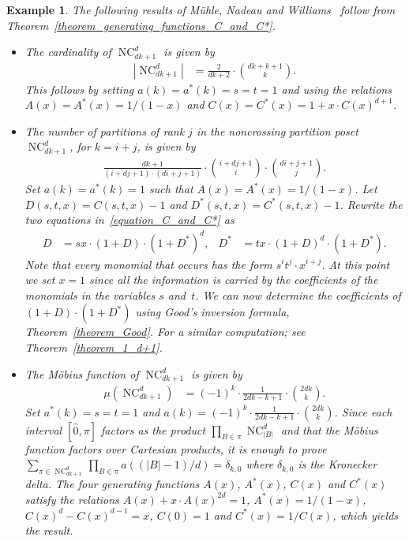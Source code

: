 \documentclass[11pt]{amsart}
\newtheorem{example}[theorem]{Example}
\numberwithin{equation}{section}
\newcommand{\binomial}[2]{\binom{#1}{#2}}
\newcommand{\hz}{\widehat{0}}
\DeclareMathOperator{\NC}{NC}
\begin{document}
\begin{example}
{\rm
The following results of M\"uhle, Nadeau and
Williams~\cite{Muhle_Nadeau_Williams}     
follow from Theorem~\ref{theorem_generating_functions_C_and_C*}.
\begin{itemize}
\item[(a)]
\cite[Theorem~1.2]{Muhle_Nadeau_Williams}
The cardinality of $\NC^{d}_{dk+1}$ is given by
\begin{align*}
\left| \NC^{d}_{dk+1} \right|
& =
\frac{2}{dk+2} \cdot \binom{dk+k+1}{k} .
\end{align*}
This follows by setting $a(k) = a^{*}(k) = s = t = 1$
and using the relations
$A(x) = A^{*}(x) = 1/(1-x)$
and $C(x) = C^{*}(x)= 1 + x \cdot C(x)^{d+1}$.
\item[(b)]
\cite[Corollary~4.6]{Muhle_Nadeau_Williams}
The number of partitions of rank $j$ 
in the noncrossing partition poset $\NC^{d}_{dk+1}$,
for $k = i+j$, is given by
\begin{align*}
\frac{dk+1}{(i+dj+1) \cdot (di+j+1)}
\cdot
\binomial{i+dj+1}{i} \cdot \binomial{di+j+1}{j} .
\end{align*}
Set $a(k) = a^{*}(k) = 1$ such that
$A(x) = A^{*}(x) = 1/(1-x)$.
Let $D(s,t,x) = C(s,t,x) - 1$ and $D^{*}(s,t,x) = C^{*}(s,t,x) - 1$.
Rewrite the two equations in~\eqref{equation_C_and_C*} as
\begin{align*}
D
& =
sx \cdot (1+D) \cdot (1+D^{*})^{d} , &
D^{*}
& =
tx \cdot (1+D)^{d} \cdot (1+D^{*}) .
\end{align*}
Note that every monomial that occurs has the form $s^{i} t^{j} \cdot x^{i+j}$.
At this point we set $x=1$ since all the information is carried by the coefficients
of the monomials in the variables $s$ and~$t$.
We can now determine the coefficients of $(1+D) \cdot (1+D^{*})$
using Good's inversion formula, Theorem~\ref{theorem_Good}.
For a similar computation; see Theorem~\ref{theorem_1_d+1}.

\item[(c)]
\cite[Corollary~4.9]{Muhle_Nadeau_Williams}
The M\"obius function of $\NC^{d}_{dk+1}$ is given by
\begin{align*}
\mu( \NC^{d}_{dk+1} )
& =
(-1)^{k} \cdot \frac{1}{2dk-k+1} \cdot \binom{2dk}{k} .
\end{align*}
Set $a^{*}(k) = s = t = 1$ and $a(k) = (-1)^{k} \cdot \frac{1}{2dk-k+1} \cdot \binom{2dk}{k}$.
Since each interval $[\hz,\pi]$ factors as the product
$\prod_{B \in \pi} \NC^{d}_{|B|}$ and that the M\"obius function factors
over Cartesian products, it is enough to prove
$\sum_{\pi \in \NC^{d}_{dk+1}} \prod_{B \in \pi} a((|B|-1)/d) = \delta_{k,0}$
where $\delta_{k,0}$ is the Kronecker delta.
The four generating functions
$A(x)$, 
$A^{*}(x)$, 
$C(x)$ and 
$C^{*}(x)$
satisfy the relations
$A(x) + x \cdot A(x)^{2d} = 1$,
$A^{*}(x) = 1/(1-x)$,
$C(x)^{d} - C(x)^{d-1} = x$, $C(0) = 1$
and $C^{*}(x) = 1/C(x)$,
which yields the result.
\end{itemize}
}
\label{example_Big_example}
\end{example}
\end{document}
